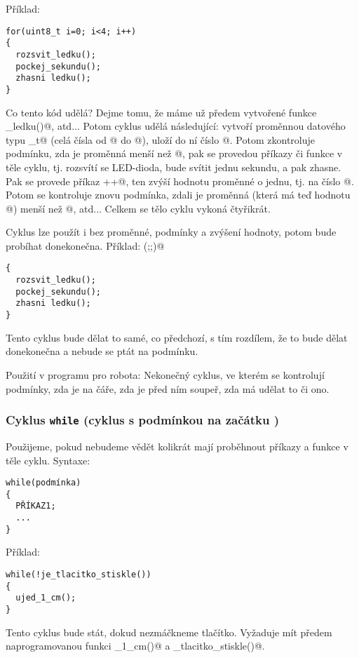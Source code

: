 Příklad:
\begin{verbatim}
for(uint8_t i=0; i<4; i++)
{
  rozsvit_ledku();
  pockej_sekundu();
  zhasni ledku();
}
\end{verbatim}
Co tento kód udělá? Dejme tomu, že máme už předem vytvořené funkce \verb@rozsvit_ledku()@, atd... 
Potom cyklus udělá následující: vytvoří proměnnou \verb@i@ datového typu _t@ (celá čísla od @ do @),
 uloží do ní číslo @. 
 Potom zkontroluje podmínku, zda je proměnná \verb@i@ menší než @, pak se provedou příkazy či funkce v těle cyklu,
  tj. rozsvítí se LED-dioda, bude svítit jednu sekundu, a pak zhasne. 
  Pak se provede příkaz \verb@i++@, ten zvýší hodnotu proměnné o jednu, 
  tj. na číslo @. Potom se kontroluje znovu podmínka, zdali je
   proměnná \verb@i@ (která má teď hodnotu @) menší než @, atd... Celkem se tělo cyklu vykoná čtyřikrát.

Cyklus \verb@for@ lze použít i bez proměnné, podmínky a zvýšení hodnoty, potom bude probíhat donekonečna.
Příklad:
\verb@for(;;)@
\begin{verbatim}
{
  rozsvit_ledku();
  pockej_sekundu();
  zhasni ledku();
}
\end{verbatim} 
Tento cyklus bude dělat to samé, co předchozí, s tím rozdílem, že to bude dělat donekonečna a nebude se ptát na podmínku. 

Použití v programu pro robota: Nekonečný cyklus, ve kterém se kontrolují podmínky, zda je na čáře, zda je před ním soupeř, zda má udělat to či ono.


\subsubsection{Cyklus  \texttt{while}  (cyklus s podmínkou na začátku )} 

Použijeme, pokud nebudeme vědět kolikrát mají proběhnout příkazy a funkce v těle cyklu.
Syntaxe:

\begin{verbatim}
while(podmínka)
{
  PŘÍKAZ1;
  ...
}
\end{verbatim}


Příklad:
\begin{verbatim}
while(!je_tlacitko_stiskle())
{
  ujed_1_cm();
}
\end{verbatim}

Tento cyklus bude stát, dokud nezmáčkneme tlačítko. Vyžaduje mít předem naprogramovanou funkci \verb@ujed_1_cm()@ a \verb@je_tlacitko_stiskle()@.

